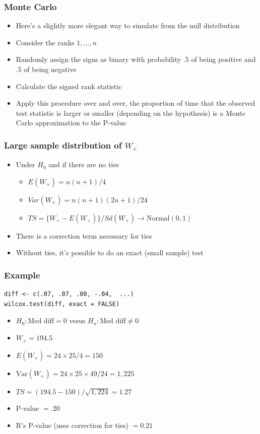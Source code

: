 \documentclass[aspectratio=169]{beamer}
\newcommand{\Var}{\mathrm{Var}}
\begin{document}
\begin{frame}\frametitle{Monte Carlo}
\begin{itemize}
\item Here's a slightly more elegant way to simulate from the null distribution
\item Consider the ranks $1,\ldots,n$
\item Randomly assign the signs as binary with probability $.5$ of
  being positive and $.5$ of being negative
\item Calculate the signed rank statistic
\item Apply this procedure over and over, the proportion of time that
  the observed test statistic is larger or smaller (depending on the hypothesis)
  is a Monte Carlo approximation to the P-value
\end{itemize}
\end{frame}


\begin{frame}\frametitle{Large sample distribution of $W_+$}
\begin{itemize}
\item Under $H_0$ and if there are no ties 
  \begin{itemize}
  \item $E(W_+) = n(n+1)/4$
  \item $Var(W_+) = n(n+1)(2n+1)/24$
  \item $TS = \{W_+ - E(W_+)\}/Sd(W_+) \rightarrow \mathrm{Normal}(0, 1)$
  \end{itemize}
\item There is a correction term necessary for ties
\item Without ties, it's possible to do an exact (small sample) test
\end{itemize}
\end{frame}

\begin{frame}[fragile]\frametitle{Example}
\begin{verbatim}
diff <- c(.07, .07, .00, -.04,  ...)
wilcox.test(diff, exact = FALSE)
\end{verbatim}
\begin{itemize}
\item $H_0:\mbox{Med diff} = 0$ vesus $H_a:\mbox{Med diff} \neq 0$
\item $W_+ = 194.5$
\item $E(W_+) = 24 \times 25 / 4 = 150$
\item $\Var(W_+) = 24 \times 25 \times 49 / 24 = 1,225$
\item $TS = (194.5 - 150) / \sqrt{1,224} = 1.27$
\item P-value $=.20$
\item R's P-value (uses correction for ties) $= 0.21$
\end{itemize}
\end{frame}
\end{document}
